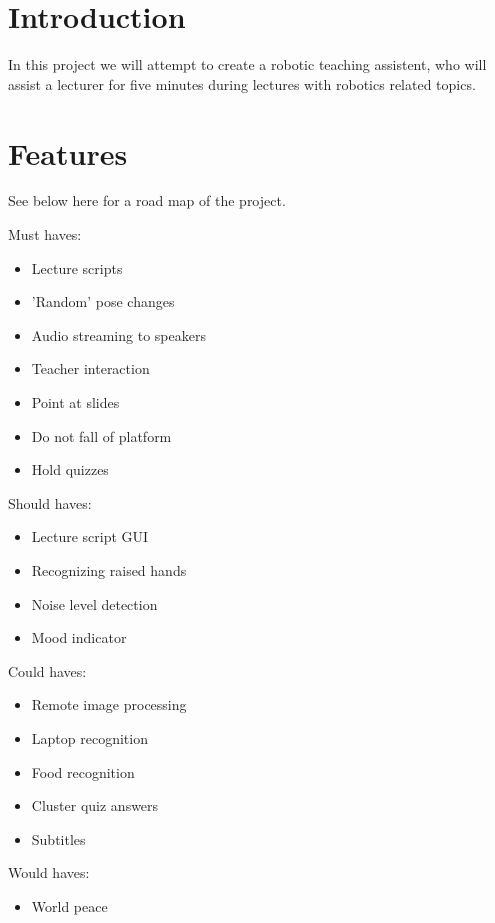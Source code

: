 \documentclass[a4paper,10pt]{report}
\begin{document}
\section{Introduction}
\label{sec:intro}

In this project we will attempt to create a robotic teaching assistent, who will assist a lecturer for five minutes during lectures with robotics related topics.

\section{Features}
\label{sec:features}
See below here for a road map of the project.
\begin{description}
 \item Must haves:
	\begin{itemize}
		\item Lecture scripts
		\item 'Random' pose changes
		\item Audio streaming to speakers
		\item Teacher interaction
		\item Point at slides
		\item Do not fall of platform
		\item Hold quizzes
	\end{itemize}

 \item Should haves:
	\begin{itemize}
		\item Lecture script GUI
		\item Recognizing raised hands
		\item Noise level detection
		\item Mood indicator
	\end{itemize}

 \item Could haves:
	\begin{itemize}
		\item Remote image processing
		\item Laptop recognition
		\item Food recognition
		\item Cluster quiz answers
		\item Subtitles
	\end{itemize}

 \item Would haves:
	\begin{itemize}
		\item World peace
	\end{itemize}
\end{description}
\end{document}
